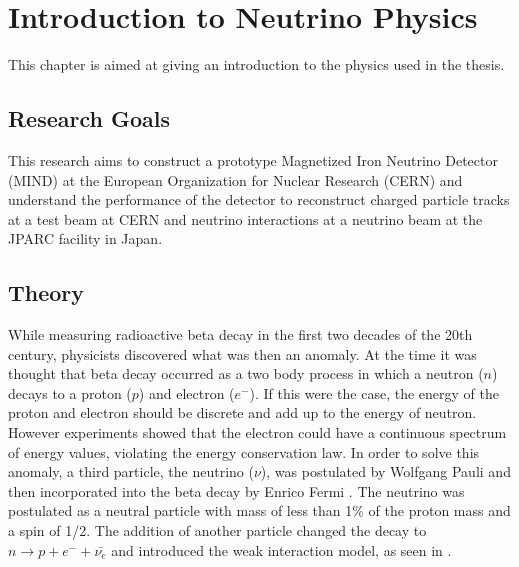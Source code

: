 \chapter{Introduction to Neutrino Physics}
\label{c:theoryIntro}

This chapter is aimed at giving an introduction to the physics used in the thesis.

\section{Research Goals}
This research aims to construct a prototype Magnetized Iron Neutrino Detector (MIND) at the European Organization for Nuclear Research (CERN) and understand the performance of the detector to reconstruct charged particle tracks at a test beam at CERN and neutrino interactions at a neutrino beam at the JPARC facility in Japan.

\section{Theory}\label{subsection:Theory}
While measuring radioactive beta decay in the first two decades of the 20th century, physicists discovered what was then an anomaly. At the time it was thought that beta decay occurred as a two body process in which a neutron ($n$) decays to a proton ($p$) and electron ($e^-$). If this were the case, the energy of the proton and electron should be discrete and add up to the energy of neutron. However experiments showed that the electron could have a continuous spectrum of energy values, violating the energy conservation law. In order to solve this anomaly, a third particle, the neutrino ($\nu$), was postulated by Wolfgang Pauli \cite{4Pauli:Online} and then incorporated into the beta decay by Enrico Fermi \cite{5Wilson}. The neutrino was postulated as a neutral particle with mass of less than 1\% of the proton mass and a spin of 1/2. The addition of another particle changed the decay to $n \rightarrow p + e^- + \bar{\nu_e}$ and introduced the weak interaction model, as seen in . 

